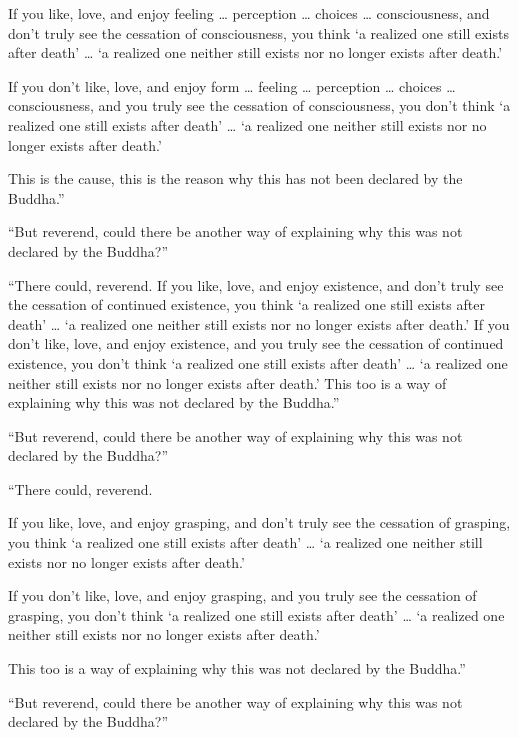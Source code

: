 \documentclass[12pt,openany]{book}%
\begin{document}
If you like, love, and enjoy feeling … perception … choices … consciousness, and don’t truly see the cessation of consciousness, you think ‘a realized one still exists after death’ … ‘a realized one neither still exists nor no longer exists after death.’ 

If you don’t like, love, and enjoy form … feeling … perception … choices … consciousness, and you truly see the cessation of consciousness, you don’t think ‘a realized one still exists after death’ … ‘a realized one neither still exists nor no longer exists after death.’ 

This is the cause, this is the reason why this has not been declared by the Buddha.” 

“But reverend, could there be another way of explaining why this was not declared by the Buddha?” 

“There could, reverend. If you like, love, and enjoy existence, and don’t truly see the cessation of continued existence, you think ‘a realized one still exists after death’ … ‘a realized one neither still exists nor no longer exists after death.’ If you don’t like, love, and enjoy existence, and you truly see the cessation of continued existence, you don’t think ‘a realized one still exists after death’ … ‘a realized one neither still exists nor no longer exists after death.’ This too is a way of explaining why this was not declared by the Buddha.” 

“But reverend, could there be another way of explaining why this was not declared by the Buddha?” 

“There could, reverend. 

If you like, love, and enjoy grasping, and don’t truly see the cessation of grasping, you think ‘a realized one still exists after death’ … ‘a realized one neither still exists nor no longer exists after death.’ 

If you don’t like, love, and enjoy grasping, and you truly see the cessation of grasping, you don’t think ‘a realized one still exists after death’ … ‘a realized one neither still exists nor no longer exists after death.’ 

This too is a way of explaining why this was not declared by the Buddha.” 

“But reverend, could there be another way of explaining why this was not declared by the Buddha?” 
\end{document}
